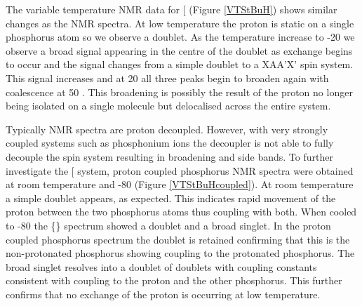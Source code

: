 {The variable temperature \proton{} NMR data for [\tButhixantphos\ce{H]CH(SO2CF3)2} (Figure \ref{VTStBuH}) shows similar changes as the \phosphorus{} NMR spectra.  At low temperature the proton is static on a single phosphorus atom so we observe a doublet.  As the temperature increase to -20 \degC{} we observe a broad signal appearing in the centre of the doublet as exchange begins to occur and the signal changes from a simple doublet to a XAA'X' spin system.  This signal increases and at 20 \degC{} all three peaks begin to broaden again with coalescence at 50 \degC. This broadening is possibly the result of the proton no longer being isolated on a single molecule but delocalised across the entire system.   

Typically \phosphorus{} NMR spectra are proton decoupled.  However, with very strongly coupled systems such as phosphonium ions the decoupler is not able to fully decouple the spin system resulting in broadening and side bands.  To further investigate the [\tButhixantphos\ce{H]CH(SO2CF3)2} system, proton coupled phosphorus NMR spectra were obtained at room temperature and -80\degC{} (Figure \ref{VTStBuHcoupled}).  At room temperature a simple doublet appears, as expected.  This indicates rapid movement of the proton between the two phosphorus atoms thus coupling with both.  When cooled to -80\degC{} the \phosphorus\{\proton\} spectrum showed a doublet and a broad singlet.  In the proton coupled phosphorus spectrum the doublet is retained confirming that this is the non-protonated phosphorus showing coupling to the protonated phosphorus.  The broad singlet resolves into a doublet of doublets with coupling constants consistent with coupling to the proton and the other phosphorus.  This further confirms that no exchange of the proton is occurring at low temperature.  

}
